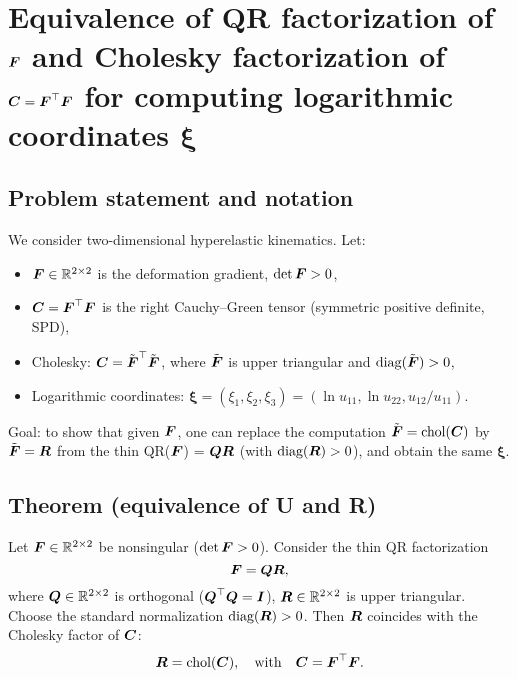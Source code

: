 \appendix

\chapter{\texorpdfstring{Equivalence of QR factorization of $\boldsymbol{F}$ and Cholesky factorization of $\boldsymbol{C}=\boldsymbol{F}^{\top}\boldsymbol{F}$ for computing logarithmic coordinates $\boldsymbol{\xi}$}{Equivalence of QR and Cholesky}}
\label{app:cholesky}

\section{Problem statement and notation}

We consider two-dimensional hyperelastic kinematics. Let:
\begin{itemize}
  \item $\boldsymbol{F} \in \mathbb{R}^{2 \times 2}$ is the deformation gradient, $\det \boldsymbol{F} > 0$,
  \item $\boldsymbol{C} = \boldsymbol{F}^{\top}\boldsymbol{F}$ is the right Cauchy–Green tensor (symmetric positive definite, SPD),
  \item Cholesky: $\boldsymbol{C} = \tilde{\boldsymbol{F}}^{\top}\tilde{\boldsymbol{F}}$, where $\tilde{\boldsymbol{F}}$ is upper triangular and $\text{diag}(\tilde{\boldsymbol{F}}) > 0$,
  \item Logarithmic coordinates:
    $\boldsymbol{\xi} = (\xi_1, \xi_2, \xi_3) = (\ln u_{11}, \ln u_{22}, u_{12}/u_{11})$.
\end{itemize}

Goal: to show that given $\boldsymbol{F}$, one can replace the computation $\tilde{\boldsymbol{F}} = \text{chol}(\boldsymbol{C})$ by $\tilde{\boldsymbol{F}} = \boldsymbol{R}$ from the thin QR($\boldsymbol{F}$) = $\boldsymbol{Q} \boldsymbol{R}$ (with $\text{diag}(\boldsymbol{R}) > 0$), and obtain the same $\boldsymbol{\xi}$.

\section{Theorem (equivalence of U and R)}

Let $\boldsymbol{F} \in \mathbb{R}^{2 \times 2}$ be nonsingular ($\det \boldsymbol{F} > 0$). Consider the thin QR factorization
\begin{equation}
\boldsymbol{F} = \boldsymbol{Q} \boldsymbol{R},
\end{equation}
where $\boldsymbol{Q} \in \mathbb{R}^{2 \times 2}$ is orthogonal ($\boldsymbol{Q}^{\top}\boldsymbol{Q} = \boldsymbol{I}$), $\boldsymbol{R} \in \mathbb{R}^{2 \times 2}$ is upper triangular. Choose the standard normalization $\text{diag}(\boldsymbol{R}) > 0$. Then $\boldsymbol{R}$ coincides with the Cholesky factor of $\boldsymbol{C}$:
\begin{equation}
\boldsymbol{R} = \text{chol}(\boldsymbol{C}), \quad \text{with} \quad \boldsymbol{C} = \boldsymbol{F}^{\top}\boldsymbol{F}.
\end{equation}

